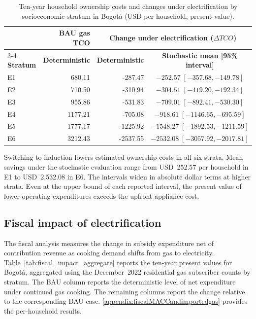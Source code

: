 \documentclass[authoryear,preprint,review,10pt]{elsarticle}
\begin{document}
\begin{table}[htbp]
    \centering
    \caption{Ten-year household ownership costs and changes under electrification by socioeconomic stratum in Bogotá (USD per household, present value).}
    \label{tab:tco_ci}
    \begin{tabular}{lrrc}
        \toprule
        & \textbf{BAU gas TCO} & \multicolumn{2}{c}{\textbf{Change under electrification ($\Delta TCO$)}} \\
        \cmidrule(lr){3-4}
        \textbf{Stratum} & \textbf{Deterministic} & \textbf{Deterministic}
        & \textbf{Stochastic mean [95\% interval]} \\
        \midrule
        E1 & 680.11  & -287.47  & $-252.57\;[-357.68,-149.78]$ \\
        E2 & 710.50  & -310.94  & $-304.51\;[-419.20,-192.34]$ \\
        E3 & 955.86  & -531.83  & $-709.01\;[-892.41,-530.30]$ \\
        E4 & 1177.21 & -705.08  & $-918.61\;[-1146.65,-695.59]$ \\
        E5 & 1777.17 & -1225.92 & $-1548.27\;[-1892.53,-1211.59]$ \\
        E6 & 3212.43 & -2537.55 & $-2532.08\;[-3057.92,-2017.81]$ \\
        \bottomrule
    \end{tabular}
\end{table}

Switching to induction lowers estimated ownership costs in all six strata. Mean savings under the stochastic evaluation range from USD~252.57 per household in E1 to USD~2,532.08 in E6. The intervals widen in absolute dollar terms at higher strata. Even at the upper bound of each reported interval, the present value of lower operating expenditures exceeds the upfront appliance cost.

\subsection{Fiscal impact of electrification}
\label{results:fiscal}

The fiscal analysis measures the change in subsidy expenditure net of contribution revenue as cooking demand shifts from gas to electricity. Table~\ref{tab:fiscal_impact_aggregate} reports the ten-year present values for Bogotá, aggregated using the December~2022 residential gas subscriber counts by stratum. The BAU column reports the deterministic level of net expenditure under continued gas cooking. The remaining columns report the change relative to the corresponding BAU case. \ref{appendix:fiscalMACCandimportedgas} provides the per-household results.
\end{document}

